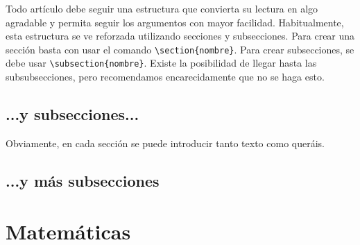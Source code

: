 \documentclass{TEMat-article}
\begin{document}
Todo artículo debe seguir una estructura que convierta su lectura en algo agradable y permita seguir los argumentos con mayor facilidad.
Habitualmente, esta estructura se ve reforzada utilizando secciones y subsecciones.
Para crear una sección basta con usar el comando \verb+\section{nombre}+.
Para crear subsecciones, se debe usar \verb+\subsection{nombre}+.
Existe la posibilidad de llegar hasta las subsubsecciones, pero recomendamos encarecidamente que no se haga esto.

\subsection{...y subsecciones...}

Obviamente, en cada sección se puede introducir tanto texto como queráis.

\subsection{...y más subsecciones}

\section{Matemáticas}
\end{document}
